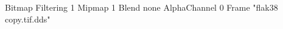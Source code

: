 {Bitmap
	{Filtering 1}
	{Mipmap 1}
	{Blend none}
	{AlphaChannel 0}
	{Frame "flak38 copy.tif.dds"}
}
